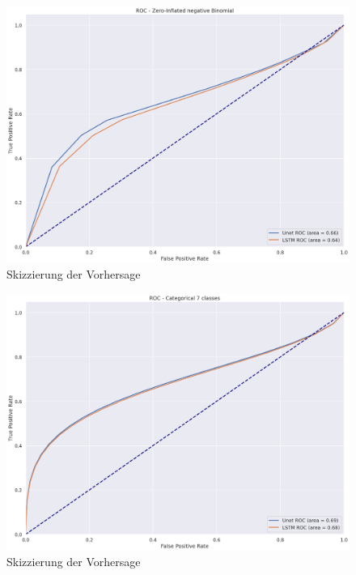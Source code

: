 \begin{figure}[htb]
 \centering
 \includegraphics[width=1.0\textwidth,angle=0]{abb/ROC_ZINFBINOM.png}
 \caption{Skizzierung der Vorhersage}
\label{fig:Vorhersage_skizze}
\end{figure}

\begin{figure}[htb]
 \centering
 \includegraphics[width=1.0\textwidth,angle=0]{abb/ROC_Categorical.png}
 \caption{Skizzierung der Vorhersage}
\label{fig:Vorhersage_skizze}
\end{figure}



\newpage






\newpage
